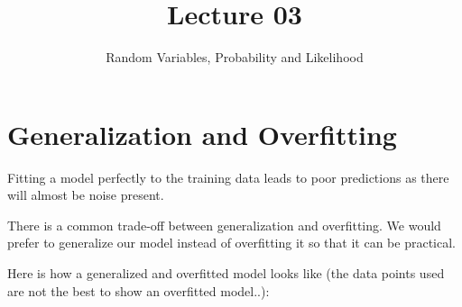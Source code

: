 \documentclass[12pt]{article}
\title{Lecture 03}
\author{Random Variables, Probability and Likelihood}
\begin{document}
\maketitle{}

\section{Generalization and Overfitting}
Fitting a model perfectly to the training data leads to poor predictions as there will almost be noise present.
\vspace{1.5em}

There is a common trade-off between generalization and overfitting. We would prefer to generalize our model instead of overfitting it so that it can be practical. 
\vspace{1.5em}

Here is how a generalized and overfitted model looks like (the data points used are not the best to show an overfitted model..):
\vspace{1.5em}
\end{document}
